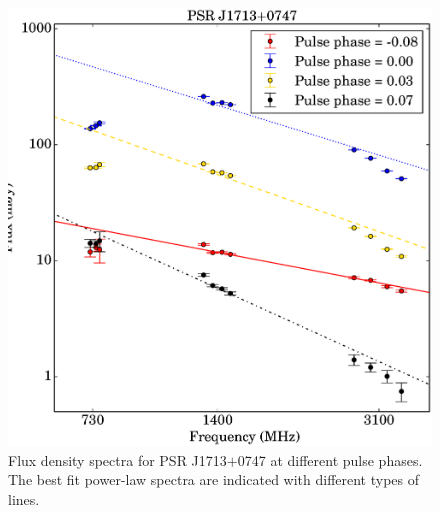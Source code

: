 \documentclass[useAMS,usenatbib]{mn2e}
\begin{document}
\begin{figure}
\begin{center}
\includegraphics[width=3 in]{1713phaseSI.ps}
\caption{Flux density spectra for PSR J1713$+$0747 at different pulse phases. The best fit power-law 
spectra are indicated with different types of lines.} 
\label{1713SI}
\end{center}
\end{figure}
\end{document}
